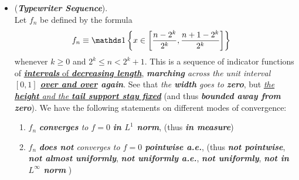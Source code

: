 \documentclass[11pt]{article}
\begin{document}
\begin{itemize}
\item \begin{example}  (\emph{\textbf{Typewriter Sequence}}). \\
Let $f_n$ be defined by the formula
\begin{align*}
f_{n} &\equiv \ind{x \in \brac{ \frac{n- 2^{k}}{2^{k}} , \frac{n+ 1- 2^{k}}{2^{k}}}}
\end{align*} whenever $k \ge  0$ and $2^k \le  n < 2^{k}+1$. This is a sequence of indicator functions of \underline{\emph{\textbf{intervals}} of \emph{\textbf{decreasing length}}}, \emph{\textbf{marching} across the unit interval $[0, 1]$ \textbf{\underline{over and over} again}}. See that \emph{the \textbf{width} goes to \textbf{zero}}, but \underline{\emph{the \textbf{height} and the \textbf{tail support stay fixed}}} (and thus \emph{\textbf{bounded away from zero}}). We have the following statements on different modes of convergence:
\begin{enumerate}
\item $f_n$ \emph{\textbf{converges} to $f = 0$} \emph{\textbf{in $L^1$ norm}}, (thus \emph{\textbf{in measure}}) 
\item  $f_n$ \emph{\textbf{does not} converges  to $f = 0$ \textbf{pointwise a.e.}}, (thus \emph{\textbf{not pointwise}}, \emph{\textbf{not almost uniformly}}, \emph{\textbf{not uniformly a.e.}},  \emph{\textbf{not uniformly}}, \emph{\textbf{not in $L^{\infty}$ norm}} ) 
\end{enumerate}
\end{example}
\end{itemize}
\end{document}
